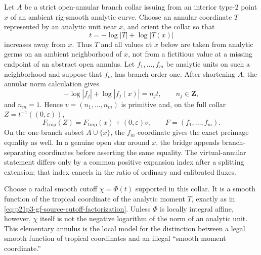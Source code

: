 
\begin{example}
\label{ex:p21p3-ordinary-annulus-collar}
Let \(A\) be a strict open-annular branch collar issuing from an interior
type-\(2\) point \(x\) of an ambient rig-smooth analytic curve.  Choose an
annular coordinate \(T\) represented by an analytic unit near \(x\), and
orient the collar so that
\[
                  t=-\log|T|+\log|T(x)|
\]
increases away from \(x\).  Thus \(T\) and all values at \(x\) below are
taken from analytic germs on an ambient neighborhood of \(x\), not from a
fictitious value at a missing endpoint of an abstract open annulus.  Let
\(f_1,\ldots,f_m\) be analytic units on such a neighborhood and suppose
that \(f_m\) has branch order one.  After shortening \(A\), the annular norm
calculation gives
\[
 -\log|f_j|+\log|f_j(x)|=n_jt,
 \qquad n_j\in\mathbf Z,
\]
and \(n_m=1\).  Hence \(v=(n_1,\ldots,n_m)\) is primitive and, on the full
collar \(Z=t^{-1}((0,\varepsilon))\),
\[
 F_{\mathrm{trop}}(Z)=F_{\mathrm{trop}}(x)+(0,\varepsilon)v,
 \qquad F=(f_1,\ldots,f_m).
\]
On the one-branch subset \(A\cup\{x\}\), the \(f_m\)-coordinate gives the
exact preimage equality as well.  In a genuine open star around \(x\), the
bridge appends branch-separating coordinates before asserting the same
equality.  The virtual-annular statement differs only by a common positive
expansion index after a splitting extension; that index cancels in the ratio
of ordinary and calibrated fluxes.

Choose a radial smooth cutoff \(\chi=\Phi(t)\) supported in this collar.  It
is a smooth function of the tropical coordinate of the analytic moment
\(T\), exactly as in
\eqref{eq:p21p3-gf-source-cutoff-factorization}.  Unless \(\Phi\) is
locally integral affine, however, \(\chi\) itself is not the negative
logarithm of the norm of an analytic unit.  This elementary annulus is the
local model for the distinction between a legal smooth function of tropical
coordinates and an illegal ``smooth moment coordinate.''
\end{example}

